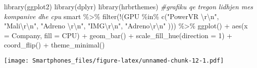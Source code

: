 \documentclass[
]{article}
\newenvironment{Shaded}{\begin{snugshade}}{\end{snugshade}}
\newcommand{\AttributeTok}[1]{\textcolor[rgb]{0.77,0.63,0.00}{#1}}
\newcommand{\CommentTok}[1]{\textcolor[rgb]{0.56,0.35,0.01}{\textit{#1}}}
\newcommand{\DecValTok}[1]{\textcolor[rgb]{0.00,0.00,0.81}{#1}}
\newcommand{\FunctionTok}[1]{\textcolor[rgb]{0.00,0.00,0.00}{#1}}
\newcommand{\NormalTok}[1]{#1}
\newcommand{\SpecialCharTok}[1]{\textcolor[rgb]{0.00,0.00,0.00}{#1}}
\newcommand{\StringTok}[1]{\textcolor[rgb]{0.31,0.60,0.02}{#1}}
\begin{document}
\begin{Shaded}
\begin{Highlighting}[]
\FunctionTok{library}\NormalTok{(ggplot2)}
\FunctionTok{library}\NormalTok{(dplyr)}
\FunctionTok{library}\NormalTok{(hrbrthemes)}
\CommentTok{\#grafiku qe tregon lidhjen mes kompanive dhe cpu}
\NormalTok{smart }\SpecialCharTok{\%\textgreater{}\%}
 \FunctionTok{filter}\NormalTok{(}\SpecialCharTok{!}\NormalTok{(GPU }\SpecialCharTok{\%in\%} \FunctionTok{c}\NormalTok{(}\StringTok{"PowerVR }\SpecialCharTok{\textbackslash{}r\textbackslash{}n}\StringTok{"}\NormalTok{, }\StringTok{"Mali}\SpecialCharTok{\textbackslash{}r\textbackslash{}n}\StringTok{"}\NormalTok{, }\StringTok{"Adreno }\SpecialCharTok{\textbackslash{}r\textbackslash{}n}\StringTok{"}\NormalTok{, }\StringTok{"IMG}\SpecialCharTok{\textbackslash{}r\textbackslash{}n}\StringTok{"}\NormalTok{, }\StringTok{"Adreno}\SpecialCharTok{\textbackslash{}r\textbackslash{}n}\StringTok{"}
\NormalTok{))) }\SpecialCharTok{\%\textgreater{}\%}
 \FunctionTok{ggplot}\NormalTok{() }\SpecialCharTok{+}
 \FunctionTok{aes}\NormalTok{(}\AttributeTok{x =} \StringTok{\textasciigrave{}}\AttributeTok{Company}\StringTok{\textasciigrave{}}\NormalTok{, }\AttributeTok{fill =}\NormalTok{ CPU) }\SpecialCharTok{+}
 \FunctionTok{geom\_bar}\NormalTok{() }\SpecialCharTok{+}
 \FunctionTok{scale\_fill\_hue}\NormalTok{(}\AttributeTok{direction =} \DecValTok{1}\NormalTok{) }\SpecialCharTok{+}
 \FunctionTok{coord\_flip}\NormalTok{() }\SpecialCharTok{+}
 \FunctionTok{theme\_minimal}\NormalTok{()}
\end{Highlighting}
\end{Shaded}

\texttt{[image: Smartphones\_files/figure-latex/unnamed-chunk-12-1.pdf]}
\end{document}
